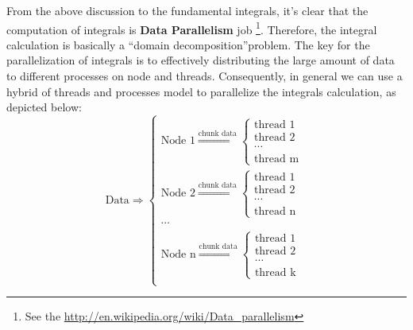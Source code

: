 From the above discussion to the fundamental integrals, it's clear that the 
computation of integrals is \textbf{Data Parallelism} job \footnote{See the 
\url{http://en.wikipedia.org/wiki/Data_parallelism}}. Therefore, the integral
calculation is basically a ``domain decomposition''problem. The key
for the parallelization of integrals is to effectively distributing the large
amount of data to different processes on node and threads. Consequently,
in general we can use a hybrid of threads and processes model to parallelize
the integrals calculation, as depicted below:
\begin{equation}
 \text{Data} \Longrightarrow 
\begin{cases}
\text{Node 1} \overset{\text{chunk data}}{\Longrightarrow}  \begin{cases}
                                                        \text{thread 1}  \\
                                                        \text{thread 2}  \\
                                                        \cdots           \\
                                                        \text{thread m}
                                                      \end{cases}
\\
\text{Node 2} \overset{\text{chunk data}}{\Longrightarrow}  \begin{cases}
                                                        \text{thread 1} \\
                                                        \text{thread 2}  \\
                                                        \cdots           \\
                                                        \text{thread n}
                                                      \end{cases}
\\
\cdots       \\
\text{Node n} \overset{\text{chunk data}}{\Longrightarrow}  \begin{cases}
                                                         \text{thread 1} \\
                                                         \text{thread 2}  \\
                                                         \cdots           \\
                                                         \text{thread k}
                                                      \end{cases}
\\
\end{cases}
\label{general_level_of_parallel_ints}
\end{equation}

